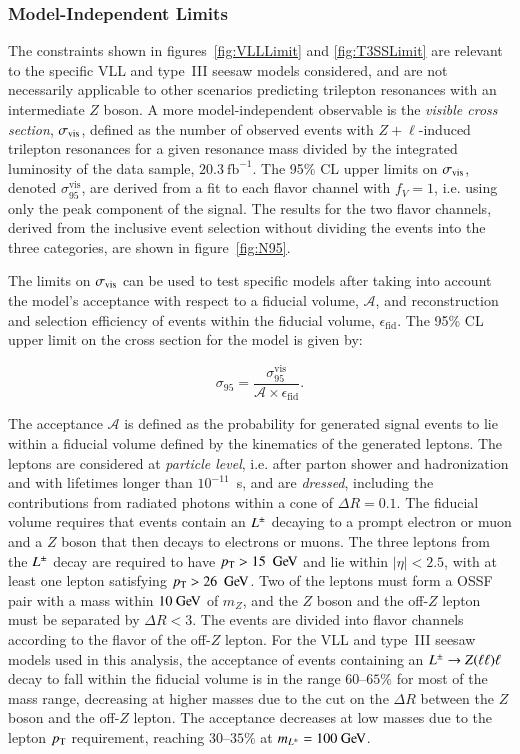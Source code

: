 \subsubsection{Model-Independent Limits}\label{sec:resonance-model-independent-limits}

The constraints shown in figures~\ref{fig:VLLLimit} and \ref{fig:T3SSLimit} are relevant to the specific VLL and type~III seesaw models considered, and are not necessarily applicable to other scenarios predicting trilepton resonances with an intermediate $Z$ boson. A more model-independent observable is the \emph{visible cross section}, $\sigma_{\mathrm{vis}}$, defined as the number of observed events with $Z+\ell$-induced trilepton resonances for a given resonance mass divided by the integrated luminosity of the data sample, $\SI{20.3}{\femto\barn\tothe{-1}}$. The 95\% CL upper limits on $\sigma_{\mathrm{vis}}$, denoted $\sigma_{95}^{\mathrm{vis}}$, are derived from a fit to each flavor channel with $f_V=1$, i.e. using only the peak component of the signal. The results for the two flavor channels, derived from the inclusive event selection without dividing the events into the three categories, are shown in figure~\ref{fig:N95}.

The limits on $\sigma_{\mathrm{vis}}$ can be used to test specific models after taking into account the model's acceptance with respect to a fiducial volume, $\mathcal{A}$, and reconstruction and selection efficiency of events within the fiducial volume, $\epsilon_{\mathrm{fid}}$. The 95\% CL upper limit on the cross section for the model is given by:

\begin{equation}\label{eqn:sigma95}
	\sigma_{95} = \frac{\sigma_{95}^{\mathrm{vis}}}{\mathcal{A}\times \epsilon_{\mathrm{fid}}}.
\end{equation}

The acceptance $\mathcal{A}$ is defined as the probability for generated signal events to lie within a fiducial volume defined by the kinematics of the generated leptons. The leptons are considered at \emph{particle level}, i.e. after parton shower and hadronization and with lifetimes longer than $10^{-11}$~s, and are \emph{dressed}, including the contributions from radiated photons within a cone of $\Delta R=0.1$. The fiducial volume requires that events contain an $L^{\pm}$ decaying to a prompt electron or muon and a $Z$ boson that then decays to electrons or muons. The three leptons from the $L^{\pm}$ decay are required to have $\pt>15~\GeV$ and lie within $|\eta|<2.5$, with at least one lepton satisfying $\pt>26~\GeV$. Two of the leptons must form a OSSF pair with a mass within $10 \GeV$ of $m_Z$, and the $Z$ boson and the off-$Z$ lepton must be separated by $\Delta R < 3$.  The events are divided into flavor channels according to the flavor of the off-$Z$ lepton. For the VLL and type~III seesaw models used in this analysis, the acceptance of events containing an $L^{\pm}\rightarrow Z(\ell\ell)\ell$ decay to fall within the fiducial volume is in the range $60$--$65\%$ for most of the mass range, decreasing at higher masses due to the cut on the $\Delta R$ between the $Z$ boson and the off-$Z$ lepton. The acceptance decreases at low masses due to the lepton $p_{\text{T}}$ requirement, reaching $30$--$35\%$ at $m_{\lpm}=100 \GeV$.

